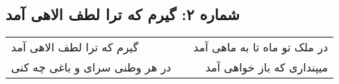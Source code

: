 \begin{center}
\section*{شماره ۲: گیرم که ترا لطف الاهی آمد}
\label{sec:002}
\begin{longtable}{l p{0.5cm} r}
گیرم که ترا لطف الاهی آمد
&&
در ملک تو ماه تا به ماهی آمد
\\
در هر وطنی سرای و باغی چه کنی
&&
میپنداری که باز خواهی آمد
\\
\end{longtable}
\end{center}
